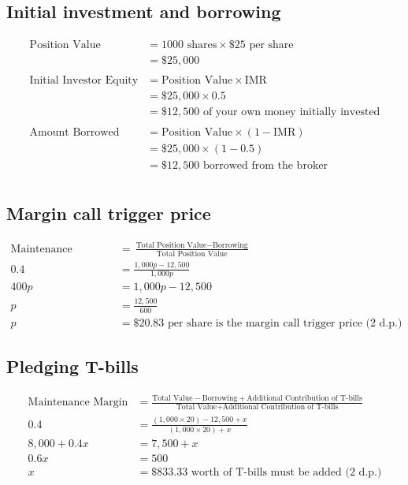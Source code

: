 \documentclass[12pt]{article}
\begin{document}
\section{}
\subsection{Initial investment and borrowing}
\begin{align*}
	\text{Position Value} &= 1000 \text{ shares} \times \$25 \text{ per share}\\
	&= \$25,000\\
	&\\
	\text{Initial Investor Equity} &= \text{Position Value} \times \text{IMR}\\
	&= \$25,000 \times 0.5\\
	&= \$12,500 \text{  of your own money initially invested}\\
	&\\
	\text{Amount Borrowed} &= \text{Position Value} \times (1-\text{IMR})\\
	&= \$25,000 \times (1-0.5)\\
	&= \$12,500 \text{  borrowed from the broker}\\
\end{align*}

\subsection{Margin call trigger price}
\begin{align*}
	\text{Maintenance Margin} &=  \frac{\text{Total Position Value} - \text{Borrowing}}{\text{Total Position Value}} \\
	0.4 &= \frac{1,000p - 12,500}{1,000p}\\
	400p &= 1,000p-12,500\\
	p &= \frac{12,500}{600}\\
	p &= \$20.83 \text{  per share is the margin call trigger price (2 d.p.)} 
\end{align*}

\subsection{Pledging T-bills}
\begin{align*}
	\text{Maintenance Margin} &=  \frac{\text{Total Value} - \text{Borrowing} + \text{Additional Contribution of T-bills}}{\text{Total Value}+ \text{Additional Contribution of T-bills}} \\
	0.4 &= \frac{(1,000\times20) - 12,500 + x}{(1,000\times20)+x} \\
	8,000 + 0.4x &= 7,500 + x\\
	0.6x &= 500\\
	x &= \$833.33 \text{ worth of T-bills must be added (2 d.p.)}\\
\end{align*}
\end{document}
